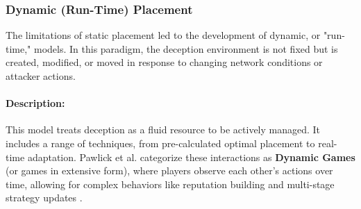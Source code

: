 \subsubsection{Dynamic (Run-Time) Placement}

The limitations of static placement led to the development of dynamic, or "run-time," models. In this paradigm,
the deception environment is not fixed but is created, modified, or moved in response to changing network
conditions or attacker actions.

\paragraph{Description:} This model treats deception as a fluid resource to be actively managed. It includes
a range of techniques, from pre-calculated optimal placement to real-time adaptation. Pawlick et al. categorize
these interactions as \textbf{Dynamic Games} (or games in extensive form), where players observe each other's
actions over time, allowing for complex behaviors like reputation building and multi-stage strategy updates \cite{pawlick2019game}.

